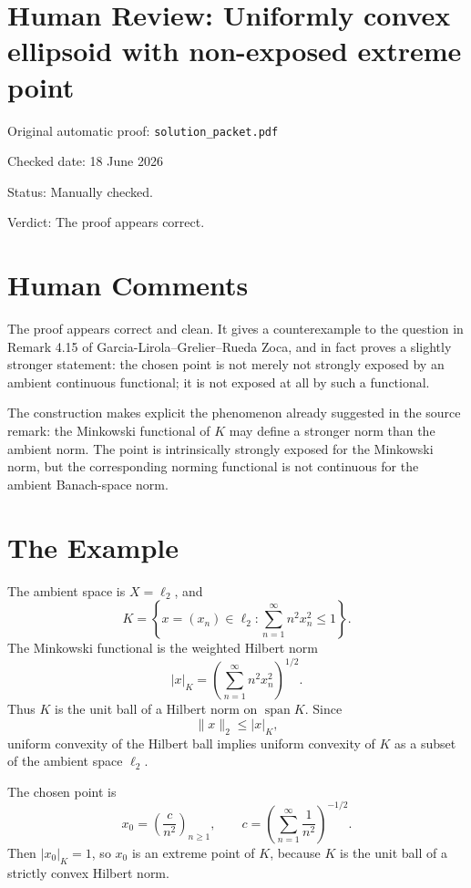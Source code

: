 \documentclass[11pt]{article}
\begin{document}
\section*{Human Review: Uniformly convex ellipsoid with non-exposed extreme point}

\noindent Original automatic proof: \texttt{solution\_packet.pdf}

\noindent Checked date: 18 June 2026

\noindent Status: Manually checked.

\noindent Verdict: The proof appears correct.

\section*{Human Comments}

The proof appears correct and clean.  It gives a counterexample to the
question in Remark 4.15 of Garcia-Lirola--Grelier--Rueda Zoca, and in fact
proves a slightly stronger statement: the chosen point is not merely not
strongly exposed by an ambient continuous functional; it is not exposed at
all by such a functional.

The construction makes explicit the phenomenon already suggested in the
source remark: the Minkowski functional of \(K\) may define a stronger norm
than the ambient norm.  The point is intrinsically strongly exposed for the
Minkowski norm, but the corresponding norming functional is not continuous
for the ambient Banach-space norm.

\section*{The Example}

The ambient space is \(X=\ell_2\), and
\[
  K=
  \left\{
    x=(x_n)\in\ell_2:
    \sum_{n=1}^\infty n^2x_n^2\leq 1
  \right\}.
\]
The Minkowski functional is the weighted Hilbert norm
\[
  |x|_K=
  \left(\sum_{n=1}^\infty n^2x_n^2\right)^{1/2}.
\]
Thus \(K\) is the unit ball of a Hilbert norm on \(\operatorname{span}K\).
Since
\[
  \|x\|_2\leq |x|_K,
\]
uniform convexity of the Hilbert ball implies uniform convexity of \(K\) as a
subset of the ambient space \(\ell_2\).

The chosen point is
\[
  x_0=\left(\frac{c}{n^2}\right)_{n\geq1},
  \qquad
  c=\left(\sum_{n=1}^\infty \frac1{n^2}\right)^{-1/2}.
\]
Then \(|x_0|_K=1\), so \(x_0\) is an extreme point of \(K\), because \(K\) is
the unit ball of a strictly convex Hilbert norm.
\end{document}
